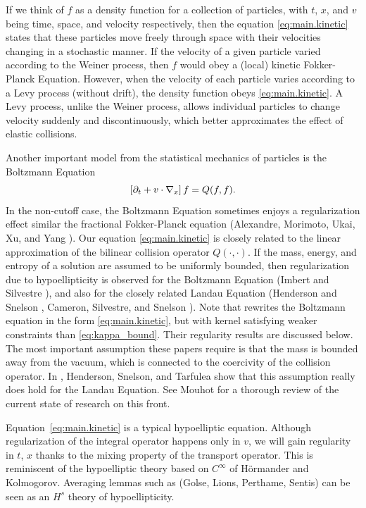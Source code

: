 If we think of $f$ as a density function for a collection of particles, with $t$, $x$, and $v$ being time, space, and velocity respectively, then the equation \eqref{eq:main.kinetic} states that these particles move freely through space with their velocities changing in a stochastic manner.  If the velocity of a given particle varied according to the Weiner process, then $f$ would obey a (local) kinetic Fokker-Planck Equation.  However, when the velocity of each particle varies according to a Levy process (without drift), the density function obeys \eqref{eq:main.kinetic}.  A Levy process, unlike the Weiner process, allows individual particles to change velocity suddenly and discontinuously, which better approximates the effect of elastic collisions.  

Another important model from the statistical mechanics of particles is the Boltzmann Equation
\[ \left[ \partial_t + v\cdot \nabla_x \right] f = Q(f,f). \]
In the non-cutoff case, the Boltzmann Equation sometimes enjoys a regularization effect similar the fractional Fokker-Planck equation (Alexandre, Morimoto, Ukai, Xu, and Yang \cite{AlMoUkXuYa}).  Our equation \eqref{eq:main.kinetic} is closely related to the linear approximation of the bilinear collision operator $Q(\cdot,\cdot)$.  If the mass, energy, and entropy of a solution are assumed to be uniformly bounded, then regularization due to hypoellipticity is observed for the Boltzmann Equation (Imbert and Silvestre \cite{ImSi}), and also for the closely related Landau Equation (Henderson and Snelson \cite{HeSn}, Cameron, Silvestre, and Snelson \cite{CaSiSn}).  Note that \cite{ImSi} rewrites the Boltzmann equation in the form \eqref{eq:main.kinetic}, but with kernel satisfying weaker constraints than \eqref{eq:kappa_bound}.  Their regularity results are discussed below.  The most important assumption these papers require is that the mass is bounded away from the vacuum, which is connected to the coercivity of the collision operator.  In \cite{HeSnTa}, Henderson, Snelson, and Tarfulea show that this assumption really does hold for the Landau Equation.  See Mouhot \cite{Mo} for a thorough review of the current state of research on this front.  


Equation~\eqref{eq:main.kinetic} is a typical hypoelliptic equation.  Although regularization of the integral operator happens only in $v$, we will gain regularity in $t$, $x$ thanks to the mixing property of the transport operator.  This is reminiscent of the hypoelliptic theory based on $C^\infty$ of H\"{o}rmander \cite{Ho} and Kolmogorov.  Averaging lemmas such as \cite{GoLiPeSe} (Golse, Lions, Perthame, Sentis) can be seen as an $H^s$ theory of hypoellipticity.  

